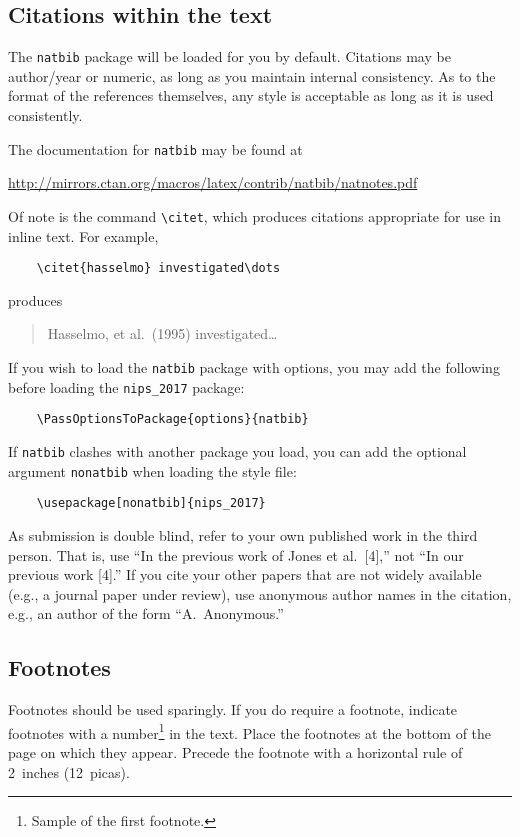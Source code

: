 \documentclass{article}
\begin{document}
	\subsection{Citations within the text}
	
	The \verb+natbib+ package will be loaded for you by default.
	Citations may be author/year or numeric, as long as you maintain
	internal consistency.  As to the format of the references themselves,
	any style is acceptable as long as it is used consistently.
	
	The documentation for \verb+natbib+ may be found at
	\begin{center}
		\url{http://mirrors.ctan.org/macros/latex/contrib/natbib/natnotes.pdf}
	\end{center}
	Of note is the command \verb+\citet+, which produces citations
	appropriate for use in inline text.  For example,
	\begin{verbatim}
	\citet{hasselmo} investigated\dots
	\end{verbatim}
	produces
	\begin{quote}
		Hasselmo, et al.\ (1995) investigated\dots
	\end{quote}
	
	If you wish to load the \verb+natbib+ package with options, you may
	add the following before loading the \verb+nips_2017+ package:
	\begin{verbatim}
	\PassOptionsToPackage{options}{natbib}
	\end{verbatim}
	
	If \verb+natbib+ clashes with another package you load, you can add
	the optional argument \verb+nonatbib+ when loading the style file:
	\begin{verbatim}
	\usepackage[nonatbib]{nips_2017}
	\end{verbatim}
	
	As submission is double blind, refer to your own published work in the
	third person. That is, use ``In the previous work of Jones et
	al.\ [4],'' not ``In our previous work [4].'' If you cite your other
	papers that are not widely available (e.g., a journal paper under
	review), use anonymous author names in the citation, e.g., an author
	of the form ``A.\ Anonymous.''
	
	\subsection{Footnotes}
	
	Footnotes should be used sparingly.  If you do require a footnote,
	indicate footnotes with a number\footnote{Sample of the first
		footnote.} in the text. Place the footnotes at the bottom of the
	page on which they appear.  Precede the footnote with a horizontal
	rule of 2~inches (12~picas).
	
\end{document}
